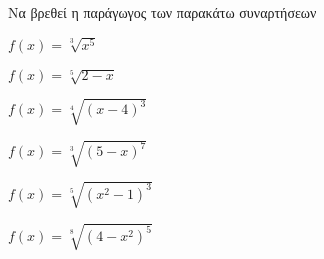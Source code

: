 Να βρεθεί η παράγωγος των παρακάτω συναρτήσεων
\begin{alist}
\item $ f(x)=\sqrt[3]{x^5} $
\item $ f(x)=\sqrt[5]{2-x} $
\item $ f(x)=\sqrt[4]{(x-4)^3} $
\item $ f(x)=\sqrt[3]{(5-x)^7} $
\item $ f(x)=\sqrt[5]{(x^2-1)^3} $
\item $ f(x)=\sqrt[8]{(4-x^2)^5} $
\end{alist}

